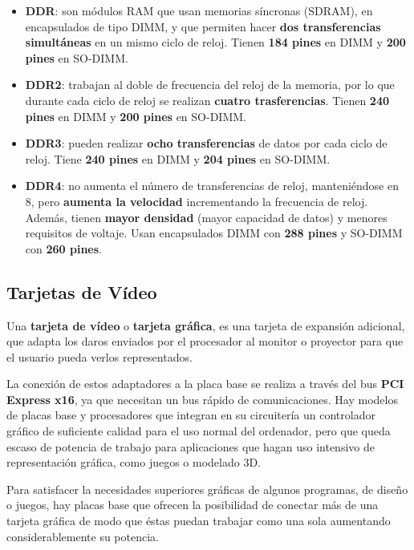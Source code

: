 \begin{itemize}
    \item \textbf{DDR}: son módulos RAM que usan memorias síncronas (SDRAM), en encapsulados de tipo DIMM, y que permiten hacer \textbf{dos transferencias simultáneas} en un mismo ciclo de reloj. Tienen \textbf{184 pines} en DIMM y \textbf{200 pines} en SO-DIMM.

    \item \textbf{DDR2}: trabajan al doble de frecuencia del reloj de la memoria, por lo que durante cada ciclo de reloj se realizan \textbf{cuatro trasferencias}. Tienen \textbf{240 pines} en DIMM y \textbf{200 pines} en SO-DIMM.

    \item \textbf{DDR3}: pueden realizar\textbf{ ocho transferencias }de datos por cada ciclo de reloj. Tiene \textbf{240 pines} en DIMM y \textbf{204 pines} en SO-DIMM.

    \item \textbf{DDR4}: no aumenta el número de transferencias de reloj, manteniéndose en 8, pero \textbf{aumenta la velocidad} incrementando la frecuencia de reloj. Además, tienen \textbf{mayor densidad} (mayor capacidad de datos) y menores requisitos de voltaje. Usan encapsulados DIMM con \textbf{288 pines} y SO-DIMM con \textbf{260 pines}.
\end{itemize}

\subsection{Tarjetas de Vídeo}
Una \textbf{tarjeta de vídeo} o \textbf{tarjeta gráfica}, es una tarjeta de expansión adicional, que adapta los daros enviados por el procesador al monitor o proyector para que el usuario pueda verlos representados.

La conexión de estos adaptadores a la placa base se realiza a través del bus \textbf{PCI Express x16}, ya que necesitan un bus rápido de comunicaciones. Hay modelos de  placas base y procesadores que integran en su circuitería un controlador gráfico de suficiente calidad para el uso normal del ordenador, pero que queda escaso de potencia de trabajo para aplicaciones que hagan uso intensivo de representación gráfica, como juegos o modelado 3D.

Para satisfacer la necesidades superiores gráficas de algunos programas, de diseño o juegos, hay placas base que ofrecen la posibilidad de conectar más de una tarjeta gráfica de modo que éstas puedan trabajar como una sola aumentando considerablemente su potencia.

